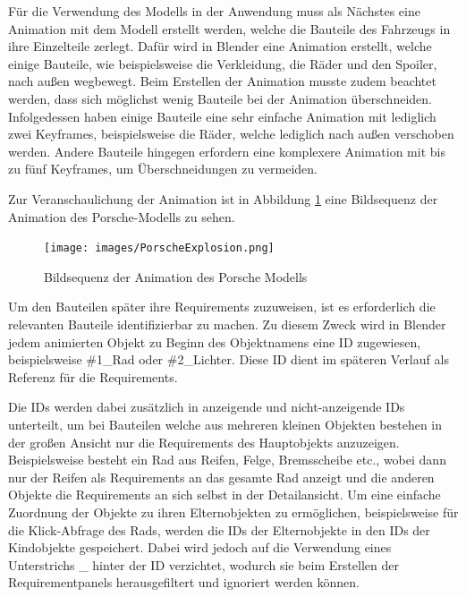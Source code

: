 Für die Verwendung des Modells in der Anwendung muss als Nächstes eine Animation mit dem Modell erstellt werden, welche die Bauteile des Fahrzeugs in ihre Einzelteile zerlegt.
Dafür wird in Blender eine Animation erstellt, welche einige Bauteile, wie beispielsweise die Verkleidung, die Räder und den Spoiler, nach außen wegbewegt.
Beim Erstellen der Animation musste zudem beachtet werden, dass sich möglichst wenig Bauteile bei der Animation überschneiden.
Infolgedessen haben einige Bauteile eine sehr einfache Animation mit lediglich zwei Keyframes, beispielsweise die Räder, welche lediglich nach außen verschoben werden.
Andere Bauteile hingegen erfordern eine komplexere Animation mit bis zu fünf Keyframes, um Überschneidungen zu vermeiden.

\newpage

Zur Veranschaulichung der Animation ist in Abbildung \ref{fig:porsche-explosion} eine Bildsequenz der Animation des Porsche-Modells zu sehen.

\begin{figure}[H]
    \centering
    \texttt{[image: images/PorscheExplosion.png]}
    \caption{Bildsequenz der Animation des Porsche Modells}
    \label{fig:porsche-explosion}
\end{figure}

Um den Bauteilen später ihre Requirements zuzuweisen, ist es erforderlich die relevanten Bauteile identifizierbar zu machen.
Zu diesem Zweck wird in Blender jedem animierten Objekt zu Beginn des Objektnamens eine ID zugewiesen, beispielsweise \glqq{}\#1\_Rad\grqq{} oder \glqq{}\#2\_Lichter\grqq{}.
Diese ID dient im späteren Verlauf als Referenz für die Requirements.

Die IDs werden dabei zusätzlich in anzeigende und nicht-anzeigende IDs unterteilt, um bei Bauteilen welche aus mehreren kleinen Objekten bestehen in der großen Ansicht nur die Requirements des Hauptobjekts anzuzeigen.
Beispielsweise besteht ein Rad aus Reifen, Felge, Bremsscheibe etc., wobei dann nur der Reifen als Requirements an das gesamte Rad anzeigt und die anderen Objekte die Requirements an sich selbst in der Detailansicht.
Um eine einfache Zuordnung der Objekte zu ihren Elternobjekten zu ermöglichen, beispielsweise für die Klick-Abfrage des Rads, werden die IDs der Elternobjekte in den IDs der Kindobjekte gespeichert.
Dabei wird jedoch auf die Verwendung eines Unterstrichs \glqq{}\_\grqq{} hinter der ID verzichtet, wodurch sie beim Erstellen der Requirementpanels herausgefiltert und ignoriert werden können.

